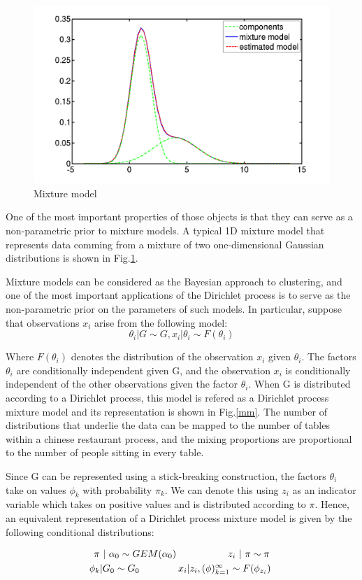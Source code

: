 \documentclass[twoside,hidelinks]{article}
\begin{document}
\begin{figure}[!ht]
    \centerline{\includegraphics[width=.45\textwidth]{1DGMM}}
	\caption{Mixture model}
	\label{1dGMM}
\end{figure}

One of the most important properties of those objects is that they can serve as a non-parametric prior to mixture models. A typical 1D mixture model that represents data comming from a mixture of two one-dimensional Gaussian distributions is shown in Fig.\ref{1dGMM}.

Mixture models can be considered as the Bayesian approach to clustering, and one of the most important applications of the Dirichlet process is to serve as the non-parametric prior on the parameters of such models. In particular, suppose that observations $x_i$ arise from the following model:
	\begin{equation}
			\theta_i | G \sim G ,
			x_i | \theta_i \sim F(\theta_i )
	\end{equation}

Where $F(\theta_i )$ denotes the distribution of the observation $x_i$ given $\theta_i $. The factors $ \theta_i $ are conditionally independent given G, and the observation $x_i$ is conditionally independent of the other observations given the factor $\theta_i$. When G is distributed according to a Dirichlet process, this model is refered as a Dirichlet process mixture model and its representation is shown in Fig.\ref{mm}. The number of distributions that underlie the data can be mapped to the number of tables within a chinese restaurant process, and the mixing proportions are proportional to the number of people sitting in every table.

Since G can be represented using a stick-breaking construction, the factors $ \theta_i $ take on values $\phi_k$ with probability $\pi_k$. We can denote this using $z_i$ as an indicator variable which takes on positive values and is distributed according to \textbf{$\pi$}. Hence, an equivalent representation of a Dirichlet process mixture model  is given by the following conditional distributions:

	\begin{equation}
		\begin{aligned}
			\centerline{ \textbf{$\pi$} $|$  $ \alpha_0  \sim GEM(\alpha_0 )\ \ \ \ \ \ \ \ \ \ \ \ \ \ \ \   z_i$ $|$ \textbf{$ \pi \sim \pi  $} } \\
			\centerline{$ \phi_k | G_0 \sim G_0 $\ \ \ \ \ \ \ \ \ \ \ \ $x_i | z_i, (\phi )_{k=1}^\infty \sim F(\phi_{z_i}) $  } \\
		\end{aligned}
	\end{equation}
\end{document}
